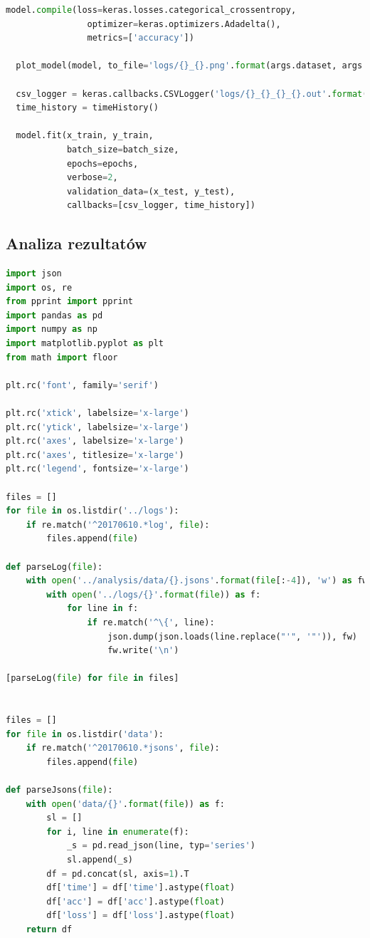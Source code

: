 \documentclass[12pt,a4paper,twoside]{article}
\begin{document}
\begin{appendices}
\begin{lstlisting}[language=python]
  model.compile(loss=keras.losses.categorical_crossentropy,
                optimizer=keras.optimizers.Adadelta(),
                metrics=['accuracy'])

  plot_model(model, to_file='logs/{}_{}.png'.format(args.dataset, args.architecture))

  csv_logger = keras.callbacks.CSVLogger('logs/{}_{}_{}_{}.out'.format(args.run_date, args.dataset, args.architecture, args.instance_type))
  time_history = timeHistory()

  model.fit(x_train, y_train,
            batch_size=batch_size,
            epochs=epochs,
            verbose=2,
            validation_data=(x_test, y_test),
            callbacks=[csv_logger, time_history])
\end{lstlisting}
\clearpage

\subsection{Analiza rezultatów}
\begin{lstlisting}[language=python]
import json
import os, re
from pprint import pprint
import pandas as pd
import numpy as np
import matplotlib.pyplot as plt
from math import floor

plt.rc('font', family='serif')

plt.rc('xtick', labelsize='x-large')
plt.rc('ytick', labelsize='x-large')
plt.rc('axes', labelsize='x-large')
plt.rc('axes', titlesize='x-large')
plt.rc('legend', fontsize='x-large')

files = []
for file in os.listdir('../logs'):
    if re.match('^20170610.*log', file):
        files.append(file)

def parseLog(file):
    with open('../analysis/data/{}.jsons'.format(file[:-4]), 'w') as fw:
        with open('../logs/{}'.format(file)) as f:
            for line in f:
                if re.match('^\{', line):
                    json.dump(json.loads(line.replace("'", '"')), fw)
                    fw.write('\n')

[parseLog(file) for file in files]


files = []
for file in os.listdir('data'):
    if re.match('^20170610.*jsons', file):
        files.append(file)

def parseJsons(file):
    with open('data/{}'.format(file)) as f:
        sl = []
        for i, line in enumerate(f):
            _s = pd.read_json(line, typ='series')
            sl.append(_s)
        df = pd.concat(sl, axis=1).T
        df['time'] = df['time'].astype(float)
        df['acc'] = df['acc'].astype(float)
        df['loss'] = df['loss'].astype(float)
    return df


\end{lstlisting}
\end{appendices}
\end{document}
